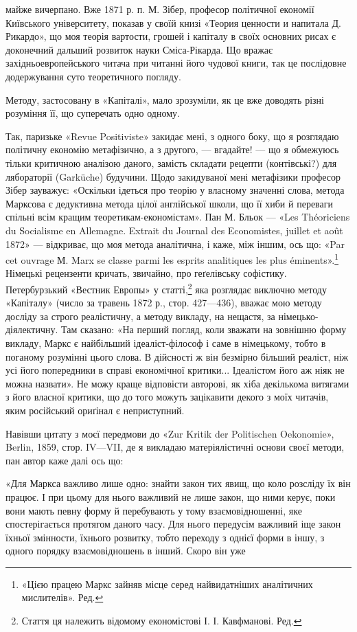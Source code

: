 \parcont{}  %
майже вичерпано. Вже 1871 р. п. М. Зібер, професор політичної
економії Київського університету, показав у своїй книзі «Теория
ценности и напитала Д. Рикардо», що моя теорія вартости, грошей
і капіталу в своїх основних рисах є доконечний дальший
розвиток науки Сміса-Рікарда. Що вражає західньоевропейського
читача при читанні його чудової книги, так це послідовне
додержування суто теоретичного погляду.

Методу, застосовану в «Капіталі», мало зрозуміли, як це вже
доводять різні розуміння її, що суперечать одно одному.

Так, паризьке «Revue Positiviste» закидає мені, з одного боку,
що я розглядаю політичну економію метафізично, а з другого, —
вгадайте! — що я обмежуюсь тільки критичною аналізою даного,
замість складати рецепти (контівські?) для лябораторії (Garküche)
будучини. Щодо закидуваної мені метафізики професор Зібер зауважує:
«Оскільки ідеться про теорію у власному значенні слова,
метода Марксова є дедуктивна метода цілої англійської школи,
що її хиби й переваги спільні всім кращим теоретикам-економістам».
Пан М. Бльок — «Les Théoriciens du Socialisme en Allemagne.
Extrait du Journal des Economistes, juillet et août 1872» —
відкриває, що моя метода аналітична, і каже, між іншим, ось що:
«Par cet ouvrage М. Marx se classe parmi les esprits analitiques les
plus éminents».\footnote*{
«Цією працею Маркс зайняв місце серед найвидатніших аналітичних
мислителів». Ред.
} Німецькі рецензенти кричать, звичайно, про
геґелівську софістику. Петербурзький «Вестник Европы» у
статті,\footnote*{
Стаття ця належить відомому економістові І. І. Кавфманові. Ред.
} яка розглядає виключно методу «Капіталу» (число за
травень 1872 р., стор. 427—436), вважає мою методу досліду за
строго реалістичну, а методу викладу, на нещастя, за німецько-діялектичну.
Там сказано: «На перший погляд, коли зважати на
зовнішню форму викладу, Маркс є найбільший ідеаліст-філософ
і саме в німецькому, тобто в поганому розумінні цього слова.
В дійсності ж він безмірно більший реаліст, ніж усі його попередники
в справі економічної критики... Ідеалістом його аж ніяк не
можна назвати». Не можу краще відповісти авторові, як хіба
декількома витягами з його власної критики, що до того можуть
зацікавити декого з моїх читачів, яким російський ориґінал є
неприступний.

Навівши цитату з моєї передмови до «Zur Kritik der Politischen
Oekonomie», Berlin, 1859, стор. IV—VII, де я викладаю
матеріялістичні основи своєї методи, пан автор каже далі ось що:

«Для Маркса важливо лише одно: знайти закон тих явищ, що
коло розсліду їх він працює. І при цьому для нього важливий не
лише закон, що ними керує, поки вони мають певну форму й перебувають
у тому взаємовідношенні, яке спостерігається протягом
даного часу. Для нього передусім важливий іще закон їхньої
змінности, їхнього розвитку, тобто переходу з однієї форми в
іншу, з одного порядку взаємовідношень в інший. Скоро він уже
\parbreak{}  %

